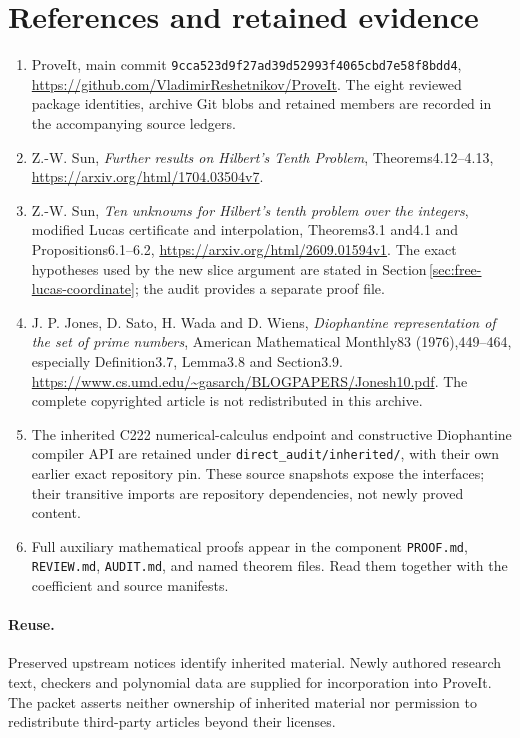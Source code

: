 \section{References and retained evidence}
\begin{enumerate}
\item ProveIt, main commit
\texttt{9cca523d9f27ad39d52993f4065cbd7e58f8bdd4},
\url{https://github.com/VladimirReshetnikov/ProveIt}.
The eight reviewed package identities, archive Git blobs and retained
members are recorded in the accompanying source ledgers.
\item Z.-W. Sun, \emph{Further results on Hilbert's Tenth Problem},
Theorems4.12--4.13,
\url{https://arxiv.org/html/1704.03504v7}.
\item Z.-W. Sun, \emph{Ten unknowns for Hilbert's tenth problem over the
integers}, modified Lucas certificate and interpolation,
Theorems3.1 and4.1 and Propositions6.1--6.2,
\url{https://arxiv.org/html/2609.01594v1}.
The exact hypotheses used by the new slice argument are stated in
Section\,\ref{sec:free-lucas-coordinate}; the audit provides a separate proof file.
\item J. P. Jones, D. Sato, H. Wada and D. Wiens,
\emph{Diophantine representation of the set of prime numbers},
American Mathematical Monthly83 (1976),449--464, especially Definition3.7,
Lemma3.8 and Section3.9.
\url{https://www.cs.umd.edu/~gasarch/BLOGPAPERS/Jonesh10.pdf}.
The complete copyrighted article is not redistributed in this archive.
\item The inherited C222 numerical-calculus endpoint and constructive
Diophantine compiler API are retained under
\texttt{direct\_audit/inherited/}, with their own earlier exact repository
pin. These source snapshots expose the interfaces; their transitive
imports are repository dependencies, not newly proved content.
\item Full auxiliary mathematical proofs appear in the component
\texttt{PROOF.md}, \texttt{REVIEW.md}, \texttt{AUDIT.md}, and named theorem
files. Read them together with the coefficient and source manifests.
\end{enumerate}
\paragraph{Reuse.}
Preserved upstream notices identify inherited material. Newly authored
research text, checkers and polynomial data are supplied for incorporation
into ProveIt. The packet asserts neither ownership of inherited material
nor permission to redistribute third-party articles beyond their licenses.
